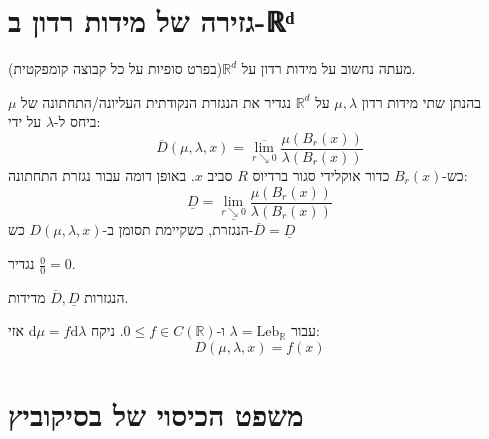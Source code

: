 \documentclass{tstextbook}
\begin{document}
\section{גזירה של מידות רדון ב-ℝᵈ}

מעתה נחשוב על מידות רדון על \(\mathbb{R}^{d}\)(בפרט סופיות על כל קבוצה קומפקטית).

\begin{definition}
בהנתן שתי מידות רדון \(\mu,\lambda\) על \(\mathbb{R}^{d}\) נגדיר את הנגזרת הנקודתית העליונה/התחתונה של \(\mu\) ביחס ל-\(\lambda\) על ידי:
$$\overline{D} \left( \mu,\lambda,x \right)=\overline{\lim_{ r\searrow 0 } } \frac{\mu(B_{r}(x))}{\lambda(B_{r}(x))}$$
כש-\(B_{r}(x)\) כדור אוקלידי סגור ברדיוס \(R\) סביב \(x\). באופן דומה עבור נגזרת התחתונה:
$$\underline{D}=\underline{\lim_{ r \searrow 0 } }  \frac{\mu(B_{r}(x))}{\lambda(B_{r}(x))}$$
הנגזרת, כשקיימת תסומן ב-\(D\left( \mu,\lambda,x \right)\) כש-\(\overline{D}=\underline{D}\)

\end{definition}
\begin{remark}
נגדיר \(\frac{0}{0}=0\).

\end{remark}
\begin{remark}
הנגזרות \(\overline{D},\underline{D}\) מדידות.

\end{remark}
\begin{example}
עבור \(\lambda=\mathrm{Leb}_{\mathbb{R}}\) ו-\(0\leq f \in C\left( \mathbb{R} \right)\). ניקח \(\mathrm{d}\mu=f\mathrm{d}\lambda\) אזי:
$$D\left( \mu,\lambda,x \right)=f(x)$$

\end{example}
\section{משפט הכיסוי של בסיקוביץ}
\end{document}
